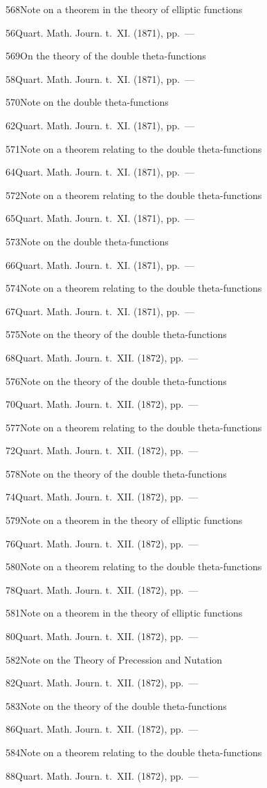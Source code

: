 \documentclass[11pt,a4paper]{book}
\providecommand{\tocentry}[2]{#1\dotfill #2\par}
\begin{document}
\tocentry{568}{Note on a theorem in the theory of elliptic functions}{56}{Quart. Math. Journ. t.~XI. (1871), pp.~---}

\tocentry{569}{On the theory of the double theta-functions}{58}{Quart. Math. Journ. t.~XI. (1871), pp.~---}

\tocentry{570}{Note on the double theta-functions}{62}{Quart. Math. Journ. t.~XI. (1871), pp.~---}

\tocentry{571}{Note on a theorem relating to the double theta-functions}{64}{Quart. Math. Journ. t.~XI. (1871), pp.~---}

\tocentry{572}{Note on a theorem relating to the double theta-functions}{65}{Quart. Math. Journ. t.~XI. (1871), pp.~---}

\tocentry{573}{Note on the double theta-functions}{66}{Quart. Math. Journ. t.~XI. (1871), pp.~---}

\tocentry{574}{Note on a theorem relating to the double theta-functions}{67}{Quart. Math. Journ. t.~XI. (1871), pp.~---}

\newpage

\tocentry{575}{Note on the theory of the double theta-functions}{68}{Quart. Math. Journ. t.~XII. (1872), pp.~---}

\tocentry{576}{Note on the theory of the double theta-functions}{70}{Quart. Math. Journ. t.~XII. (1872), pp.~---}

\tocentry{577}{Note on a theorem relating to the double theta-functions}{72}{Quart. Math. Journ. t.~XII. (1872), pp.~---}

\tocentry{578}{Note on the theory of the double theta-functions}{74}{Quart. Math. Journ. t.~XII. (1872), pp.~---}

\tocentry{579}{Note on a theorem in the theory of elliptic functions}{76}{Quart. Math. Journ. t.~XII. (1872), pp.~---}

\tocentry{580}{Note on a theorem relating to the double theta-functions}{78}{Quart. Math. Journ. t.~XII. (1872), pp.~---}

\tocentry{581}{Note on a theorem in the theory of elliptic functions}{80}{Quart. Math. Journ. t.~XII. (1872), pp.~---}

\tocentry{582}{Note on the Theory of Precession and Nutation}{82}{Quart. Math. Journ. t.~XII. (1872), pp.~---}

\tocentry{583}{Note on the theory of the double theta-functions}{86}{Quart. Math. Journ. t.~XII. (1872), pp.~---}

\tocentry{584}{Note on a theorem relating to the double theta-functions}{88}{Quart. Math. Journ. t.~XII. (1872), pp.~---}
\end{document}
